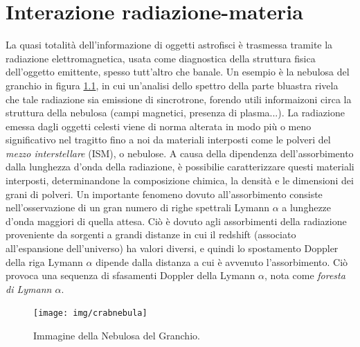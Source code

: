 \chapter{Interazione radiazione-materia}
	\label{chap:InterazioneRadiazioneMateria}
La quasi totalità dell'informazione di oggetti astrofisci è trasmessa tramite la radiazione elettromagnetica, usata come diagnostica della struttura fisica dell'oggetto emittente, spesso tutt'altro che banale. Un esempio è la nebulosa del granchio in figura \ref{fig:Crab}, in cui un'analisi dello spettro della parte bluastra rivela che tale radiazione sia emissione di sincrotrone, forendo utili informaizoni circa la struttura della nebulosa (campi magnetici, presenza di plasma...). La radiazione emessa dagli oggetti celesti viene di norma alterata in modo più o meno significativo nel tragitto fino a noi da materiali interposti come le polveri del \textit{mezzo interstellare} (ISM), o nebulose. A causa della dipendenza dell'assorbimento dalla lunghezza d'onda della radiazione, è possibilie caratterizzare questi materiali interposti, determinandone la composizione chimica, la densità e le dimensioni dei grani di polveri. 
Un importante fenomeno dovuto all'assorbimento consiste nell'osservazione di un gran numero di righe spettrali Lymann $\alpha$ a lunghezze d'onda maggiori di quella attesa. Ciò è dovuto agli assorbimenti della radiazione proveniente da sorgenti a grandi distanze in cui il redshift (associato all'espansione dell'universo) ha valori diversi, e quindi lo spostamento Doppler della riga Lymann $\alpha$ dipende dalla distanza a cui è avvenuto l'assorbimento. Ciò provoca una sequenza di sfasamenti Doppler della Lymann $\alpha$, nota come \textit{foresta di Lymann $\alpha$}.
\begin{figure}[b!]
\begin{center}
\texttt{[image: img/crabnebula]} 
\caption{Immagine della Nebulosa del Granchio.} \label{fig:Crab}
\end{center}
\end{figure}

